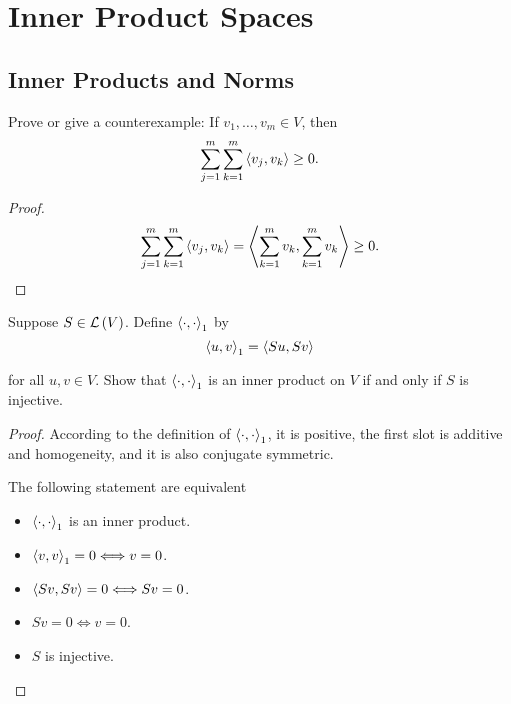 \chapter{Inner Product Spaces}

\section{Inner Products and Norms}

\begin{exercise}
    Prove or give a counterexample: If $v_{1}, \ldots, v_{m} \in V$, then
    \[
        \sum^{m}_{j=1}\sum^{m}_{k=1}\left\langle{v_{j}, v_{k}}\right\rangle\geq 0.
    \]
\end{exercise}

\begin{proof}
    \[
        \sum^{m}_{j=1}\sum^{m}_{k=1}\left\langle{v_{j}, v_{k}}\right\rangle = \left\langle{\sum^{m}_{k=1}v_{k}, \sum^{m}_{k=1}v_{k}}\right\rangle\geq 0.\qedhere
    \]
\end{proof}
\newpage

\begin{exercise}
    Suppose $S\in\mathcal{L}\left({V}\right)$. Define ${\left\langle{\cdot, \cdot}\right\rangle}_{1}$ by
    \[
        {\left\langle{u, v}\right\rangle}_{1} = \left\langle{Su, Sv}\right\rangle
    \]

    for all $u, v\in V$. Show that ${\left\langle{\cdot, \cdot}\right\rangle}_{1}$ is an inner product on $V$ if and only if $S$ is injective.
\end{exercise}

\begin{proof}
    According to the definition of ${\left\langle{\cdot, \cdot}\right\rangle}_{1}$, it is positive, the first slot is additive and homogeneity, and it is also conjugate symmetric.

    The following statement are equivalent
    \begin{itemize}
        \item ${\left\langle{\cdot, \cdot}\right\rangle}_{1}$ is an inner product.
        \item ${\left\langle{v, v}\right\rangle}_{1} = 0\Longleftrightarrow v = 0$.
        \item $\left\langle{Sv, Sv}\right\rangle = 0\Longleftrightarrow Sv = 0$.
        \item $Sv = 0\Longleftrightarrow v = 0$.
        \item $S$ is injective.
    \end{itemize}
\end{proof}
\newpage

